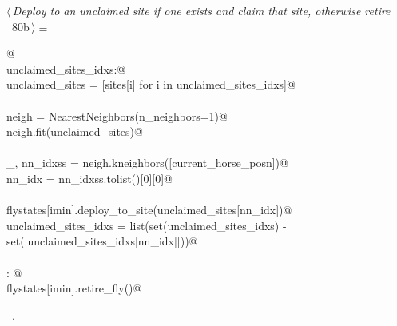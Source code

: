 \documentclass[11.5pt]{report}
\begin{document}
\vspace{-0.8cm} \newchunk
\begin{flushleft} \small
\begin{minipage}{\linewidth}\label{scrap125}\raggedright\small
{} $\langle\,${\itshape Deploy  to an unclaimed site if one exists and claim that site, otherwise retire }\nobreak\ {\footnotesize {80b}}$\,\rangle\equiv$
\vspace{-1ex}
\begin{list}{}{} \item
\mbox{}\verb@  @\\
\mbox{}\verb@if  unclaimed_sites_idxs:@\\
\mbox{}\verb@    unclaimed_sites = [sites[i] for i in unclaimed_sites_idxs]@\\
\mbox{}\verb@@\\
\mbox{}\verb@    neigh = NearestNeighbors(n_neighbors=1)@\\
\mbox{}\verb@    neigh.fit(unclaimed_sites)@\\
\mbox{}\verb@@\\
\mbox{}\verb@    _, nn_idxss = neigh.kneighbors([current_horse_posn])@\\
\mbox{}\verb@    nn_idx      = nn_idxss.tolist()[0][0]@\\
\mbox{}\verb@@\\
\mbox{}\verb@    flystates[imin].deploy_to_site(unclaimed_sites[nn_idx])@\\
\mbox{}\verb@    unclaimed_sites_idxs = list(set(unclaimed_sites_idxs) - \@\\
\mbox{}\verb@                                set([unclaimed_sites_idxs[nn_idx]]))@\\
\mbox{}\verb@@\\
\mbox{}\verb@else: @\\
\mbox{}\verb@    flystates[imin].retire_fly()@\\
\mbox{}\verb@@{\NWsep}
\end{list}
\vspace{-1.5ex}
\footnotesize
\begin{list}{}{\setlength{\itemsep}{-\parsep}\setlength{\itemindent}{-\leftmargin}}
\item \NWtxtMacroRefIn\ .

\item{}
\end{list}
\end{minipage}\vspace{4ex}
\end{flushleft}
\end{document}
